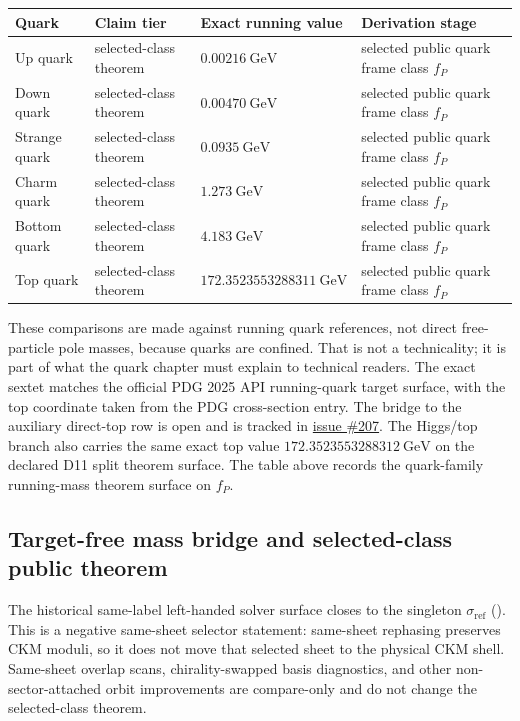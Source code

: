 \documentclass[11pt]{article}
\newcommand{\ophid}[1]{\path{#1}}
\begin{document}
\begin{table}[h]
\centering
\small
\begin{tabular}{@{}llll@{}}
\toprule
Quark & Claim tier & Exact running value & Derivation stage \\
\midrule
Up quark & selected-class theorem & \(0.00216~\mathrm{GeV}\) & selected public quark frame class \(f_P\) \\
Down quark & selected-class theorem & \(0.00470~\mathrm{GeV}\) & selected public quark frame class \(f_P\) \\
Strange quark & selected-class theorem & \(0.0935~\mathrm{GeV}\) & selected public quark frame class \(f_P\) \\
Charm quark & selected-class theorem & \(1.273~\mathrm{GeV}\) & selected public quark frame class \(f_P\) \\
Bottom quark & selected-class theorem & \(4.183~\mathrm{GeV}\) & selected public quark frame class \(f_P\) \\
Top quark & selected-class theorem & \(172.3523553288311~\mathrm{GeV}\) & selected public quark frame class \(f_P\) \\
\bottomrule
\end{tabular}
\end{table}

These comparisons are made against running quark references, not direct free-particle pole
masses, because quarks are confined. That is not a technicality; it is part of what the quark
chapter must explain to technical readers. The exact sextet matches the official PDG 2025 API
running-quark target surface, with the top coordinate taken from the PDG cross-section entry. The
bridge to the auxiliary direct-top row is open and is tracked in
\href{https://github.com/FloatingPragma/observer-patch-holography/issues/207}{issue \#207}. The Higgs/top branch also carries the same exact
top value \(172.3523553288312~\mathrm{GeV}\) on the declared D11 split theorem surface. The table above
records the quark-family running-mass theorem surface on \(f_P\).

\subsection{Target-free mass bridge and selected-class public theorem}\label{quark-family-strongest-overlap-branch-primitives}

The historical same-label left-handed solver surface closes to the singleton
\(\sigma_{\mathrm{ref}}\) (\ophid{sigma_ref}). This is a negative same-sheet selector statement:
same-sheet rephasing preserves CKM moduli, so it does not move that selected sheet to the
physical CKM shell. Same-sheet overlap scans, chirality-swapped basis diagnostics, and other
non-sector-attached orbit improvements are compare-only and do not change the selected-class
theorem.
\end{document}
